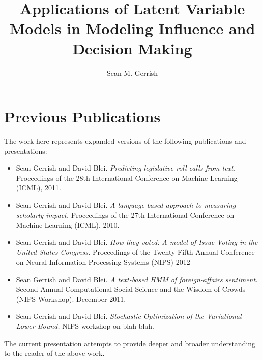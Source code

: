 \documentclass[table]{puthesis}
\author{Sean M. Gerrish}
\title{Applications of Latent Variable Models in Modeling Influence and Decision Making}
\begin{document}

\section*{Previous Publications}
The work here represents expanded versions of the following publications and presentations:
\begin{itemize}
\item Sean Gerrish and David Blei. \emph{Predicting legislative roll
    calls from text.} Proceedings of the 28th International Conference
  on Machine Learning (ICML), 2011.
\item Sean Gerrish and David Blei. \emph{A language-based approach to
    measuring scholarly impact.}  Proceedings of the 27th
  International Conference on Machine Learning (ICML), 2010.
\item Sean Gerrish and David Blei. \emph{How they voted: A model of
    Issue Voting in the United States Congress.}  Proceedings of the
  Twenty Fifth Annual Conference on Neural Information Processing
  Systems (NIPS) 2012
\item Sean Gerrish and David Blei. \emph{A text-based HMM of
    foreign-affairs sentiment.} Second Annual Computational Social
  Science and the Wisdom of Crowds (NIPS Workshop).  December 2011.
\item Sean Gerrish and David Blei. \emph{Stochastic Optimization of
    the Variational Lower Bound.} NIPS workshop on blah blah.
\end{itemize}

The current presentation attempts to provide deeper and broader
understanding to the reader of the above work.









%


% 

%





%


\end{document}
